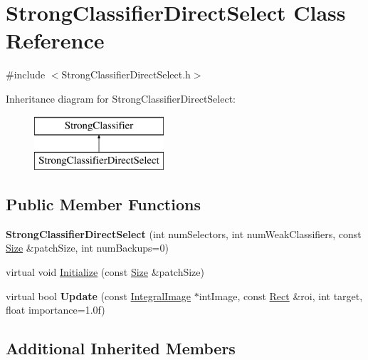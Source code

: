 \hypertarget{classStrongClassifierDirectSelect}{}\section{Strong\+Classifier\+Direct\+Select Class Reference}
\label{classStrongClassifierDirectSelect}


{\ttfamily \#include $<$Strong\+Classifier\+Direct\+Select.\+h$>$}

Inheritance diagram for Strong\+Classifier\+Direct\+Select\+:\begin{figure}[H]
\begin{center}
\leavevmode
\includegraphics[height=2.000000cm]{classStrongClassifierDirectSelect}
\end{center}
\end{figure}
\subsection*{Public Member Functions}
\begin{DoxyCompactItemize}
\item 
\hypertarget{classStrongClassifierDirectSelect_a9e22d3f25ce43d6f2e3234d502b71df1}{}{\bfseries Strong\+Classifier\+Direct\+Select} (int num\+Selectors, int num\+Weak\+Classifiers, const \hyperlink{classSize}{Size} \&patch\+Size, int num\+Backups=0)\label{classStrongClassifierDirectSelect_a9e22d3f25ce43d6f2e3234d502b71df1}

\item 
virtual void \hyperlink{classStrongClassifierDirectSelect_a423d4e2df75252d92c9e24cb9c37b166}{Initialize} (const \hyperlink{classSize}{Size} \&patch\+Size)
\item 
\hypertarget{classStrongClassifierDirectSelect_a70f5944801a3023fb52e5f69028c76eb}{}virtual bool {\bfseries Update} (const \hyperlink{classIntegralImage}{Integral\+Image} $\ast$int\+Image, const \hyperlink{classRect}{Rect} \&roi, int target, float importance=1.\+0f)\label{classStrongClassifierDirectSelect_a70f5944801a3023fb52e5f69028c76eb}

\end{DoxyCompactItemize}
\subsection*{Additional Inherited Members}



